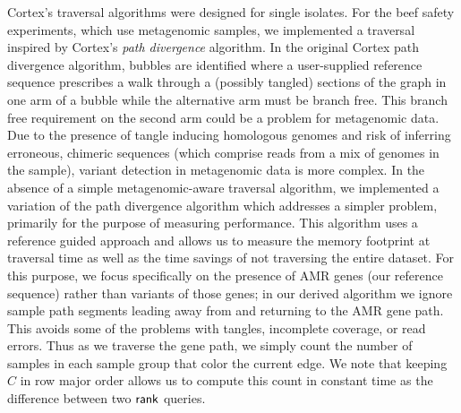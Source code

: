 {\sc Cortex}'s traversal algorithms were designed for single isolates. For the beef safety experiments, which use metagenomic samples, we implemented a traversal inspired by {\sc Cortex}'s {\it path divergence} algorithm.  In the original {\sc Cortex} path divergence algorithm, bubbles are identified where a user-supplied reference sequence prescribes a walk through a (possibly tangled) sections of the graph in one arm of a bubble while the alternative arm must be branch free.  This branch free requirement on the second arm could be a problem for metagenomic data. Due to the presence of tangle inducing homologous genomes and risk of inferring erroneous, chimeric sequences (which comprise reads from a mix of genomes in the sample), variant detection in metagenomic data is more complex. %
In the absence of a simple metagenomic-aware traversal algorithm, we implemented a variation of the path divergence algorithm which addresses a simpler problem, primarily for the purpose of measuring performance.  This algorithm uses a reference guided approach and allows us to measure the memory footprint at traversal time as well as the time savings of not traversing the entire dataset.  For this purpose, we focus specifically on the presence of AMR genes (our reference sequence) rather than variants of those genes; in our derived algorithm we ignore sample path segments leading away from and returning to the AMR gene path.  This avoids some of the problems with tangles, incomplete coverage, or read errors.  Thus as we traverse the gene path, we simply count the number of samples in each sample group that color the current edge.   We note that keeping $C$ in row major order allows us to compute this count in constant time as the difference between two $\mathsf{rank}$ queries.  










